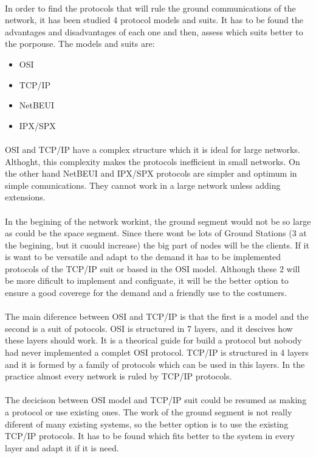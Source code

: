 \paragraph{}
In order to find the protocols that will rule the ground communications of the network, it has been studied 4 protocol models and suits. It has to be found the advantages and disadvantages of each one and then, assess which suits better to the porpouse. The models and suits are:
\begin{itemize}
\item OSI
\item TCP/IP
\item NetBEUI
\item IPX/SPX
\end{itemize}
\paragraph{} 
OSI and TCP/IP have a complex structure which it is ideal for large networks. Althoght, this complexity makes the protocols inefficient in small networks. On the other hand NetBEUI and IPX/SPX protocols are simpler and optimum in simple comunications. They cannot work in a large network unless adding extensions. 
\paragraph{}
In the begining of the network workint, the ground segment would not be so large as could be the space segment. Since there wont be lots of Ground Stations (3 at the begining, but it cuould increase) the big part of nodes will be the clients. If it is want to be versatile and adapt to the demand it has to be implemented protocols of the TCP/IP suit or based in the OSI model. Although these 2 will be more dificult to implement and configuate, it will be the better option to ensure a good coverege for the demand and a friendly use to the costumers.
\paragraph{}
The main diference between OSI and TCP/IP is that the first is a model and the second is a suit of potocols. OSI is structured in 7 layers, and it descives how these layers should work. It is a theorical guide for build a protocol but nobody had never implemented a complet OSI protocol. TCP/IP is structured in 4 layers and it is formed by a family of protocols which can be used in this layers. In the practice almost every network is ruled by TCP/IP protocols. 
\paragraph{}
The decicison between OSI model and TCP/IP suit could be resumed as making a protocol or use existing ones. The work of the ground segment is not really diferent of many existing systems, so the better option is to use the existing TCP/IP protocols. It has to be found which fits better to the system in every layer and adapt it if it is need.

